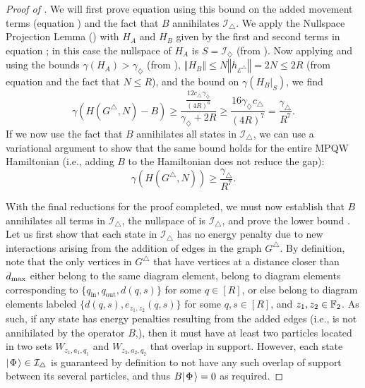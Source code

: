 \documentclass[../thesis-main/thesis-main]{subfiles}
\begin{document}
\begin{proof}[Proof of \protect{}]
We will first prove equation  using this bound on the added movement terms (equation ) and the fact that $B$ annihilates $\mathcal{I}_{\triangle}$. We apply the Nullspace Projection Lemma () with $H_{A}$ and $H_{B}$ given by the first and second terms in equation ; in this case the nullspace of $H_{A}$ is $S=\mathcal{I}_{\diamondsuit}$ (from ). Now applying  and using the bounds $\gamma(H_{A})>\gamma_{\diamondsuit}$ (from ), $\left\Vert H_{B}\right\Vert \leq N\left\Vert h_{\mathcal{E}^{\triangle}}\right\Vert =2N\leq2R$ (from equation  and the fact that $N\leq R$), and the bound  on $\gamma(H_{B}|_{S})$, we find
\begin{equation}
  \gamma(H(G^{\triangle},N)-B)\geq\frac{\frac{12c_{\triangle}\gamma_{\diamondsuit}}{(4R)^{6}}}{\gamma_{\diamondsuit}+2R}\geq\frac{16 \gamma_{\diamondsuit} c_{\triangle}}{(4R)^7}=\frac{\gamma_\triangle}{R^{7}}.
\end{equation}
If we now use the fact that $B$ annihilates all states in $\mathcal{I}_{\triangle}$, we can use a variational argument to show that the same bound holds for the entire MPQW Hamiltonian (i.e., adding $B$ to the Hamiltonian does not reduce the gap):
\begin{equation}
  \gamma(H(G^{\triangle},N)) \geq \frac{\gamma_{\triangle}}{R^7}.
\end{equation}

With the final reductions for the proof completed, we must now establish that $B$ annihilates all terms in $\mathcal{I}_{\triangle}$, the nullspace of  is $\mathcal{I}_{\triangle}$, and prove the lower bound .  Let us first show that each state in $\mathcal{I}_{\triangle}$ has no energy penalty due to new interactions arising from the addition of edges in the graph $G^{\triangle}$.  By definition, note that the only vertices in $G^{\triangle}$ that have vertices at a distance closer than $d_{\text{max}}$ either belong to the same diagram element, belong to diagram elements corresponding to $\{q_{\text{in}}, q_{\text{out}}, d(q,s)\}$ for some $q\in [R]$, or else belong to diagram elements labeled $\{d(q,s), e_{z_1,z_2}(q,s)\}$ for some $q,s\in [R]$, and $z_1,z_2\in \mathbb{F}_2$.  As such, if any state has energy penalties resulting from the added edges (i.e., is not annihilated by the operator $B$,), then it must have at least two particles located in two sets $W_{z_1,a_1,q_1}$ and $W_{z_2,a_2,q_2}$ that overlap in support.  However, each state $|\mspace{2mu} \Phi \mspace{2mu} \rangle\in \mathcal{I}_{\triangle}$ is guaranteed by definition to not have any such overlap of support between its several particles, and thus $B|\mspace{2mu} \Phi \mspace{2mu} \rangle = 0$ as required.


\end{proof}
\end{document}
